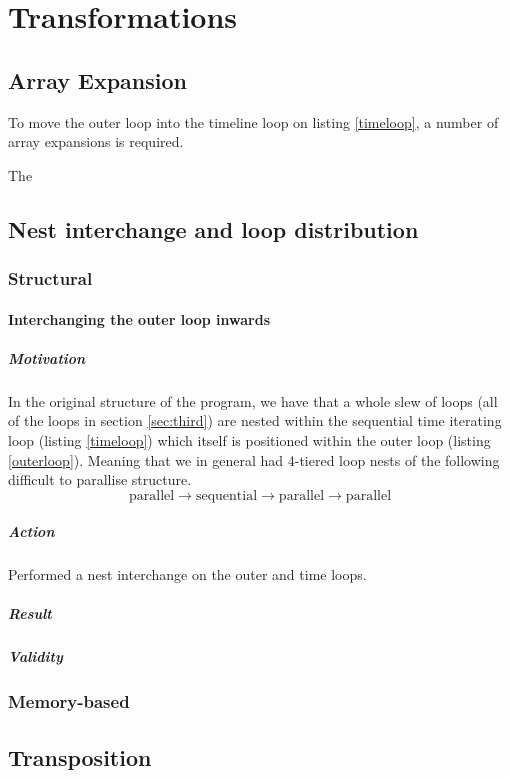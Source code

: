 \section{Transformations}

\subsection{Array Expansion}
To move the outer loop into the timeline loop on listing \ref{timeloop}, a number of array expansions is required.



The 

\subsection{Nest interchange and loop distribution}

\subsubsection{Structural}
\paragraph{Interchanging the outer loop inwards}
\subparagraph{Motivation} In the original structure of the program, we have that a whole slew of loops
 (all of the loops in section \ref{sec:third}) are nested
 within the sequential time iterating loop (listing \ref{timeloop}) which itself is positioned within
 the outer loop (listing \ref{outerloop}). Meaning that we in general had 4-tiered loop nests of the following difficult to parallise
 structure.
$$\mathrm{parallel} \to \mathrm{sequential} \to \mathrm{parallel} \to \mathrm{parallel}$$

\subparagraph{Action} Performed a nest interchange on the outer and time loops.

\subparagraph{Result}

\subparagraph{Validity}


\subsubsection{Memory-based}


\subsection{Transposition}

